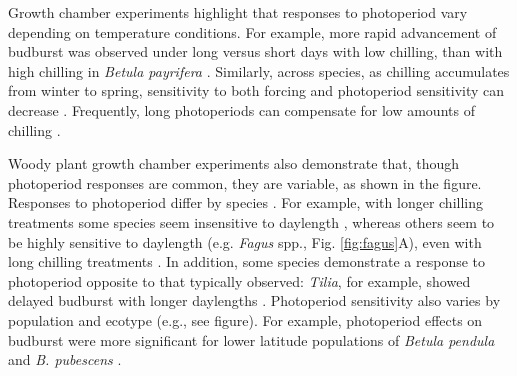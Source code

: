 \documentclass{article}
\begin{document}
\par Growth chamber experiments highlight that responses to photoperiod vary depending on temperature conditions. For example, more rapid advancement of budburst was observed under long versus short days with low chilling, than with high chilling in \emph{Betula payrifera} \citep[][see figure]{Hawkins:2012}. Similarly, across species, as chilling accumulates from winter to spring, sensitivity to both forcing and photoperiod sensitivity can decrease \citep{malyshev2018}. Frequently, long photoperiods can compensate for low amounts of chilling \citep{Caffarra:2011b,Myking:1995,Heide:1993}.%
\par Woody plant growth chamber experiments also demonstrate that, though photoperiod responses are common, they are variable, as shown in the figure. Responses to photoperiod differ by species \citep[e.g.,][]{flynn2018,zohner2016,Basler:2014aa,Basler:2012,Howe:1996,Heide:1993a}.
For example, with longer chilling treatments some species seem insensitive to daylength \citep[e.g., \emph{Hammamelis} spp., \emph{Prunus} spp.,][]{zohner2016}, %
whereas others seem to be highly sensitive to daylength (e.g. \emph{Fagus} spp., Fig. \ref{fig:fagus}A), even with long chilling treatments \citep{zohner2016}. In addition, some species demonstrate a response to photoperiod opposite to that typically observed: \emph{Tilia}, for example, showed delayed budburst with longer daylengths \citep[see Box 1-1 figure,][]{Ashby:1962aa}. %
Photoperiod sensitivity also varies by population and ecotype (e.g., see figure). For example, photoperiod effects on budburst were more significant for lower latitude populations of \emph{Betula pendula} and \emph{B. pubescens} \citep{Partanen:2005aa}. 
\end{document}
